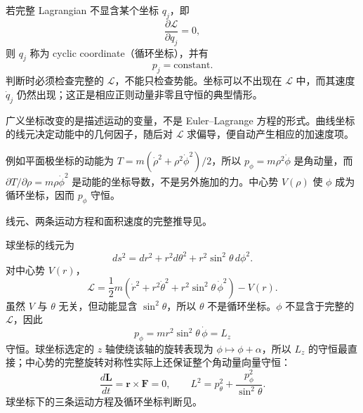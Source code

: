 若完整 Lagrangian 不显含某个坐标 $q_j$，即
\begin{equation}
  \frac{\partial\mathcal L}{\partial q_j}=0,
  \label{eq:QM-C02-S01-cyclic-condition}
\end{equation}
则 $q_j$ 称为 cyclic coordinate（循环坐标），并有
\begin{equation}
  \boxed{p_j=\text{constant}.}
  \label{eq:QM-C02-S01-cyclic-conservation}
\end{equation}
判断时必须检查完整的 $\mathcal L$，不能只检查势能。坐标可以不出现在 $\mathcal L$ 中，而其速度 $\dot q_j$ 仍然出现；这正是相应正则动量非零且守恒的典型情形。


广义坐标改变的是描述运动的变量，不是 Euler--Lagrange 方程的形式。曲线坐标的线元决定动能中的几何因子，随后对 $\mathcal L$ 求偏导，便自动产生相应的加速度项。

例如平面极坐标的动能为 $T=m(\dot\rho^2+\rho^2\dot\phi^2)/2$，所以 $p_\phi=m\rho^2\dot\phi$ 是角动量，而 $\partial T/\partial\rho=m\rho\dot\phi^2$ 是动能的坐标导数，不是另外施加的力。中心势 $V(\rho)$ 使 $\phi$ 成为循环坐标，因而 $p_\phi$ 守恒。

线元、两条运动方程和面积速度的完整推导见。


球坐标的线元为
\begin{equation}
  ds^2=dr^2+r^2d\theta^2+r^2\sin^2\theta\,d\phi^2.
  \label{eq:QM-C02-S01-spherical-line-element}
\end{equation}
对中心势 $V(r)$，
\begin{equation}
  \mathcal L
  =\frac12m\left(
    \dot r^2+r^2\dot\theta^2
    +r^2\sin^2\theta\,\dot\phi^2
  \right)-V(r).
  \label{eq:QM-C02-S01-spherical-lagrangian}
\end{equation}
虽然 $V$ 与 $\theta$ 无关，但动能显含 $\sin^2\theta$，所以 $\theta$ 不是循环坐标。$\phi$ 不显含于完整的 $\mathcal L$，因此
\begin{equation}
  p_\phi=mr^2\sin^2\theta\,\dot\phi=L_z
  \label{eq:QM-C02-S01-spherical-p-phi}
\end{equation}
守恒。球坐标选定的 $z$ 轴使绕该轴的旋转表现为 $\phi\mapsto\phi+\alpha$，所以 $L_z$ 的守恒最直接；中心势的完整旋转对称性实际上还保证整个角动量向量守恒：
\begin{equation}
  \frac{d\bm L}{dt}=\bm r\times\bm F=0,
  \qquad
  L^2=p_\theta^2+\frac{p_\phi^2}{\sin^2\theta}.
  \label{eq:QM-C02-S01-full-angular-momentum}
\end{equation}
球坐标下的三条运动方程及循环坐标判断见。

